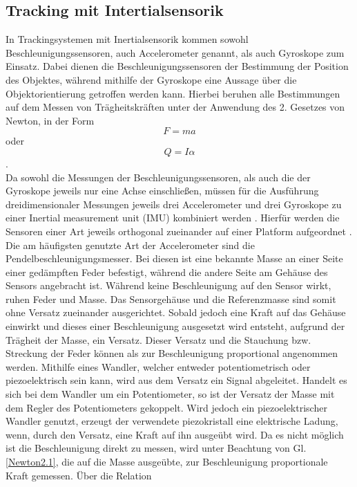 \subsection{Tracking mit Intertialsensorik}
In Trackingsystemen mit Inertialsensorik kommen sowohl Beschleunigungssensoren, auch Accelerometer genannt, als auch Gyroskope zum Einsatz. Dabei dienen die Beschleunigungssensoren der Bestimmung der Position des Objektes, während mithilfe der Gyroskope eine Aussage über die Objektorientierung getroffen werden kann. \cite{P24}
Hierbei beruhen alle Bestimmungen auf dem Messen von Trägheitskräften \cite{P32} unter der Anwendung des 2. Gesetzes von Newton, in der Form
\begin{equation}\label{Newton2.1}
    F = ma
\end{equation} oder
\begin{equation}\label{Newton2.2.}
   Q = I\alpha
\end{equation} \cite{P24}.
\\Da sowohl die Messungen der Beschleunigungssensoren, als auch die der Gyroskope jeweils nur eine Achse einschließen, müssen für die Ausführung dreidimensionaler Messungen jeweils drei Accelerometer und drei Gyroskope zu einer Inertial measurement unit (IMU) kombiniert werden \cite{P32}. Hierfür werden die Sensoren einer Art jeweils orthogonal zueinander auf einer Platform aufgeordnet \cite{P24}.
\\Die am häufigsten genutzte Art der Accelerometer sind die Pendelbeschleunigungsmesser. Bei diesen ist eine bekannte Masse an einer Seite einer gedämpften Feder befestigt, während die andere Seite am Gehäuse des Sensors angebracht ist. \cite{P32}
Während keine Beschleunigung auf den Sensor wirkt, ruhen Feder und Masse. Das Sensorgehäuse und die Referenzmasse sind somit ohne Versatz zueinander ausgerichtet. Sobald jedoch eine Kraft auf das Gehäuse einwirkt und dieses einer Beschleunigung ausgesetzt wird entsteht, aufgrund der Trägheit der Masse, ein Versatz.
Dieser Versatz und die Stauchung bzw. Streckung der Feder können als zur Beschleunigung proportional angenommen werden. Mithilfe eines Wandler, welcher entweder potentiometrisch oder piezoelektrisch sein kann, wird aus dem Versatz ein Signal abgeleitet. Handelt es sich bei dem Wandler um ein Potentiometer, so ist der Versatz der Masse mit dem Regler des Potentiometers gekoppelt. Wird jedoch ein piezoelektrischer Wandler genutzt, erzeugt der verwendete piezokristall eine elektrische Ladung, wenn, durch den Versatz, eine Kraft auf ihn ausgeübt wird.
Da es nicht möglich ist die Beschleunigung direkt zu messen, wird unter Beachtung von Gl. \ref{Newton2.1}, die auf die Masse ausgeübte, zur Beschleunigung proportionale Kraft gemessen. Über die Relation
